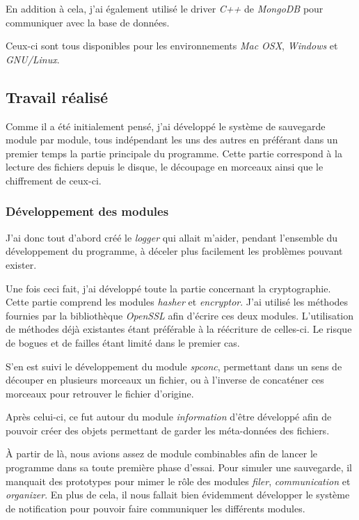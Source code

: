 \documentclass[a4paper,10pt, twoside]{report}
\begin{document}
\begin{spacing}{1.2}
En addition à cela, j'ai également utilisé le driver \textit{C++} de
\textit{MongoDB} pour communiquer avec la base de données.

Ceux-ci sont tous disponibles pour les environnements \textit{Mac OSX},
\textit{Windows} et \textit{GNU/Linux}.

\subsection{Travail réalisé}
Comme il a été initialement pensé, j'ai développé le système de
sauvegarde module par module, tous indépendant les uns des autres en
préférant dans un premier temps la partie principale du programme. Cette
partie correspond à la lecture des fichiers depuis le disque, le découpage
en morceaux ainsi que le chiffrement de ceux-ci.

\subsubsection{Développement des modules}
J'ai donc tout d'abord créé le \textit{logger} qui allait m'aider, pendant
l'ensemble du développement du programme, à déceler plus facilement les
problèmes pouvant exister.

Une fois ceci fait, j'ai développé toute la partie concernant la
cryptographie. Cette partie comprend les modules \textit{hasher} et
\textit{encryptor}. J'ai utilisé les méthodes fournies par la bibliothèque
\textit{OpenSSL} afin d'écrire ces deux modules. L'utilisation de méthodes
déjà existantes étant préférable à la réécriture de celles-ci.
Le risque de bogues et de failles étant limité dans le premier cas.

S'en est suivi le développement du module \textit{spconc}, permettant dans un
sens de découper en plusieurs morceaux un fichier, ou à l'inverse de
concaténer ces morceaux pour retrouver le fichier d'origine.

Après celui-ci, ce fut autour du module \textit{information} d'être
développé afin de pouvoir créer des objets permettant de garder les
méta-données des fichiers.

À partir de là, nous avions assez de module combinables afin de lancer le
programme dans sa toute première phase d'essai. Pour simuler une sauvegarde,
il manquait des prototypes pour mimer le rôle des modules \textit{filer},
\textit{communication} et \textit{organizer}. En plus de cela, il nous fallait
bien évidemment développer le système de notification pour pouvoir faire
communiquer les différents modules.


\end{spacing}
\end{document}
